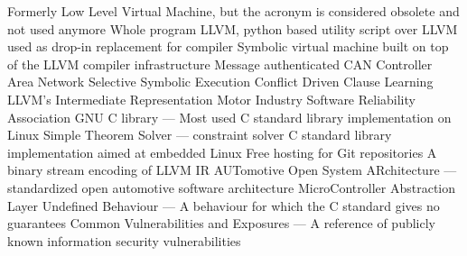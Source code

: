   {Formerly Low Level Virtual Machine, but the acronym is
               considered obsolete and not used anymore}
 {Whole program LLVM, python based utility script over LLVM used
               as drop-in replacement for compiler}
  {Symbolic virtual machine built on top of the LLVM compiler
               infrastructure}
 {Message authenticated CAN}
 {Controller Area Network}
 {Selective Symbolic Execution}
 {Conflict Driven Clause Learning}
 {LLVM's Intermediate Representation}
 {Motor Industry Software Reliability Association}
 {GNU C library --- Most used C standard library implementation on
               Linux}
 {Simple Theorem Solver --- constraint solver}
 {C standard library implementation aimed at embedded Linux}
 {Free hosting for Git repositories}
 {A binary stream encoding of LLVM IR}
 {AUTomotive Open System ARchitecture --- standardized open
                 automotive software architecture}
 {MicroController Abstraction Layer}
 {Undefined Behaviour --- A behaviour for which the C standard gives
            no guarantees}
 {Common Vulnerabilities and Exposures --- A reference of publicly
             known information security vulnerabilities}
